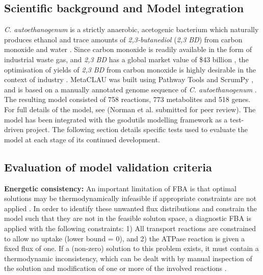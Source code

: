 \documentclass[journal=asbcd6,10pt]{achemso}
\begin{document}
\subsection{Scientific background and Model integration}

\textit{C. autoethanogenum} is a strictly anaerobic, acetogenic bacterium which naturally produces ethanol and trace amounts of \textit{2,3-butanediol} (\textit{2,3 BD}) from carbon monoxide and water \cite{abrini1994clostridium,schuchmann2014autotrophy,norman2018progress}. Since carbon monoxide is readily available in the form of industrial waste gas, and \textit{2,3 BD} has a global market value of \$43 billion \cite{kopke201123butanediol}, the optimisation of yields of \textit{2,3 BD} from carbon monoxide is highly desirable in the context of industry \cite{norman2018progress}.   
MetaCLAU was built using Pathway Tools \cite{karp2002pathway} and ScrumPy \cite{poolman2006scrumpy}, and is based on a manually annotated genome sequence of \textit{C. autoethanogenum} \cite{humphreys2015whole}. The resulting model consisted of 758 reactions, 773 metabolites and 518 genes. For full details of the model, see (Norman et al. submitted for peer review).
The model has been integrated with the gsodutils modelling framework as a test-driven project. The following section details specific tests used to evaluate the model at each stage of its continued development.

\subsection{Evaluation of model validation criteria}
\textbf{Energetic consistency:} 
An important limitation of FBA is that optimal solutions may be thermodynamically infeasible if appropriate constraints are not applied \cite{Fell1197rohtua}.
In order to identify these unwanted flux distributions and constrain the model such that they are not in the feasible soluton space, a diagnostic FBA is applied with the following constraints:
1) All transport reactions are constrained to allow no uptake (lower bound = 0), and 2) the ATPase reaction is given a fixed flux of one.
If a (non-zero) solution to this problem exists, it must contain a thermodynamic inconsistency, which can be dealt with by manual inspection of the solution and modification of one or more of the involved reactions \cite{Fell1197rohtua}.
 
\end{document}
